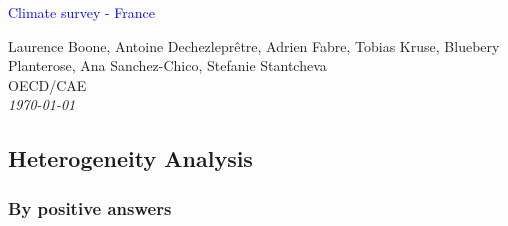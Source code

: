 



%
              





\begin{frame}
\thispagestyle{empty}
\begin{center}
\begin{LARGE}
\textcolor{blue}{Climate survey - France}
\end{LARGE}

\vspace{1cm}


Laurence Boone, Antoine Dechezleprêtre, Adrien Fabre, Tobias Kruse, Bluebery Planterose, Ana Sanchez-Chico, Stefanie Stantcheva \\

OECD/CAE \\

\textit{\today} 

\end{center}

\bigskip

\end{frame}

\subsection{Heterogeneity Analysis}


\subsubsection{By positive answers}




